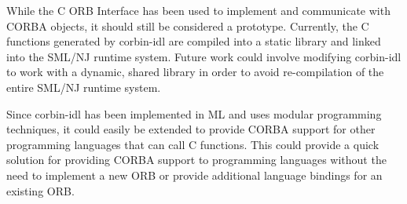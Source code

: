 

While the C ORB Interface has been used to implement and communicate 
with CORBA objects, it should still be considered a prototype.   
Currently, the C functions generated by corbin-idl are compiled 
into a static library and linked into the SML/NJ runtime system.  
Future work could involve modifying corbin-idl to work with a 
dynamic, shared library in order to avoid re-compilation of the 
entire SML/NJ runtime system.

Since corbin-idl has been implemented in ML and uses modular 
programming techniques, it could easily be extended to provide 
CORBA support for other programming languages that can call C 
functions.  This could provide a quick solution for providing 
CORBA support to programming languages without the need to 
implement a new ORB or provide additional language bindings 
for an existing ORB. 
